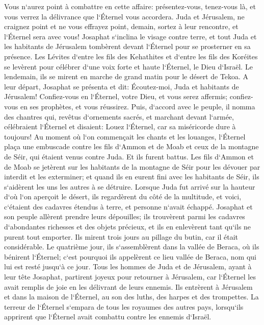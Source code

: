 \verse Vous n`aurez point à combattre en cette affaire: présentez-vous, tenez-vous là, et vous verrez la délivrance que l`Éternel vous accordera. Juda et Jérusalem, ne craignez point et ne vous effrayez point, demain, sortez à leur rencontre, et l`Éternel sera avec vous! 
\verse Josaphat s`inclina le visage contre terre, et tout Juda et les habitants de Jérusalem tombèrent devant l`Éternel pour se prosterner en sa présence. 
\verse Les Lévites d`entre les fils des Kehathites et d`entre les fils des Koréites se levèrent pour célébrer d`une voix forte et haute l`Éternel, le Dieu d`Israël. 
\verse Le lendemain, ils se mirent en marche de grand matin pour le désert de Tekoa. A leur départ, Josaphat se présenta et dit: Écoutez-moi, Juda et habitants de Jérusalem! Confiez-vous en l`Éternel, votre Dieu, et vous serez affermis; confiez-vous en ses prophètes, et vous réussirez. 
\verse Puis, d`accord avec le peuple, il nomma des chantres qui, revêtus d`ornements sacrés, et marchant devant l`armée, célébraient l`Éternel et disaient: Louez l`Éternel, car sa miséricorde dure à toujours! 
\verse Au moment où l`on commençait les chants et les louanges, l`Éternel plaça une embuscade contre les fils d`Ammon et de Moab et ceux de la montagne de Séir, qui étaient venus contre Juda. Et ils furent battus. 
\verse Les fils d`Ammon et de Moab se jetèrent sur les habitants de la montagne de Séir pour les dévouer par interdit et les exterminer; et quand ils en eurent fini avec les habitants de Séir, ils s`aidèrent les uns les autres à se détruire. 
\verse Lorsque Juda fut arrivé sur la hauteur d`où l`on aperçoit le désert, ils regardèrent du côté de la multitude, et voici, c`étaient des cadavres étendus à terre, et personne n`avait échappé. 
\verse Josaphat et son peuple allèrent prendre leurs dépouilles; ils trouvèrent parmi les cadavres d`abondantes richesses et des objets précieux, et ils en enlevèrent tant qu`ils ne purent tout emporter. Ils mirent trois jours au pillage du butin, car il était considérable. 
\verse Le quatrième jour, ils s`assemblèrent dans la vallée de Beraca, où ils bénirent l`Éternel; c`est pourquoi ils appelèrent ce lieu vallée de Beraca, nom qui lui est resté jusqu`à ce jour. 
\verse Tous les hommes de Juda et de Jérusalem, ayant à leur tête Josaphat, partirent joyeux pour retourner à Jérusalem, car l`Éternel les avait remplis de joie en les délivrant de leurs ennemis. 
\verse Ils entrèrent à Jérusalem et dans la maison de l`Éternel, au son des luths, des harpes et des trompettes. 
\verse La terreur de l`Éternel s`empara de tous les royaumes des autres pays, lorsqu`ils apprirent que l`Éternel avait combattu contre les ennemis d`Israël. 

